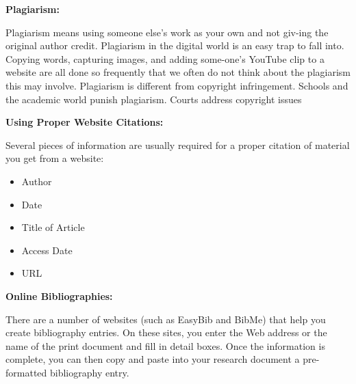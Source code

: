 \documentclass{report}
\begin{document}
    \bigbreak \noindent 

    \bigbreak \noindent \bigbreak \noindent 
    \begin{Large}
        \textbf{Plagiarism:}
    \end{Large}

    \bigbreak \noindent 
    Plagiarism means using someone else’s work as your own and not giv-ing the original author credit. Plagiarism in the digital world is an easy trap to fall into. Copying words, capturing images, and adding some-one’s YouTube clip to a website are all done so frequently that we often do not think about the plagiarism this may involve. Plagiarism is different from copyright infringement. Schools and the academic world punish plagiarism. Courts address copyright issues

    \bigbreak \noindent 

    \bigbreak \noindent \bigbreak \noindent 
    \begin{Large}
        \textbf{Using Proper Website Citations:}
    \end{Large}

    \bigbreak \noindent 
    Several pieces of information are usually required for a proper  citation of material you get from a website:

    \bigbreak \noindent 
    \begin{itemize}
        \item Author
        \item Date
        \item Title of Article
        \item Access Date
        \item URL
    \end{itemize}

    \bigbreak \noindent \bigbreak \noindent 
    \begin{Large}
        \textbf{Online Bibliographies:}
    \end{Large}

    \bigbreak \noindent 
    There are a number of websites (such as EasyBib and BibMe) that help you create bibliography entries. On these sites, you enter the Web address or the name of the print document and fill in detail boxes. Once the information is complete, you can then copy and paste into your research document a pre-formatted bibliography entry.
\end{document}
